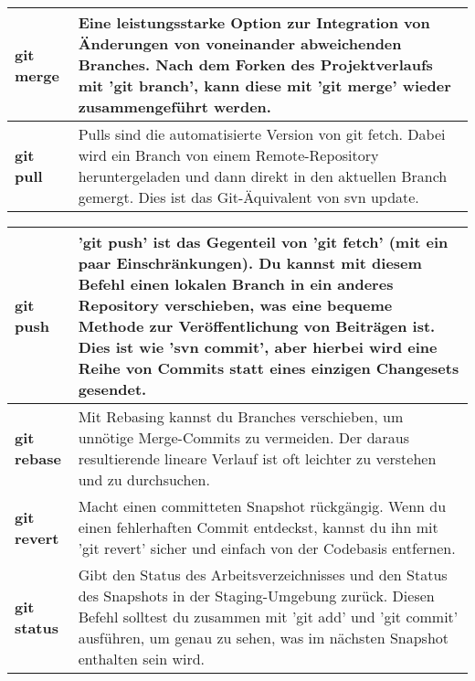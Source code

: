 \begin{center}
\begin{tabular}{|p{} | p{}|}
		\hline
		\textbf{git merge} & Eine leistungsstarke Option zur Integration von Änderungen von voneinander abweichenden Branches. Nach dem Forken des Projektverlaufs mit 'git branch', kann diese mit 'git merge' wieder zusammengeführt werden.\\
		\hline
		\textbf{git pull} & Pulls sind die automatisierte Version von git fetch. Dabei wird ein Branch von einem Remote-Repository heruntergeladen und dann direkt in den aktuellen Branch gemergt. Dies ist das Git-Äquivalent von svn update.\\
		\hline
	\end{tabular}
\end{center}

\begin{center}
	\setlength\arrayrulewidth{1pt}
	\begin{tabular}{|p{} | p{}|}
		\hline
		\textbf{git push} & 'git push' ist das Gegenteil von 'git fetch' (mit ein paar Einschränkungen). Du kannst mit diesem Befehl einen lokalen Branch in ein anderes Repository verschieben, was eine bequeme Methode zur Veröffentlichung von Beiträgen ist. Dies ist wie 'svn commit', aber hierbei wird eine Reihe von Commits statt eines einzigen Changesets gesendet.\\
		\hline
		\textbf{git rebase} & Mit Rebasing kannst du Branches verschieben, um unnötige Merge-Commits zu vermeiden. Der daraus resultierende lineare Verlauf ist oft leichter zu verstehen und zu durchsuchen.\\
		\hline
		\textbf{git revert} & Macht einen committeten Snapshot rückgängig. Wenn du einen fehlerhaften Commit entdeckst, kannst du ihn mit 'git revert' sicher und einfach von der Codebasis entfernen.\\
		\hline
		\textbf{git status} & Gibt den Status des Arbeitsverzeichnisses und den Status des Snapshots in der Staging-Umgebung zurück. Diesen Befehl solltest du zusammen mit 'git add' und 'git commit' ausführen, um genau zu sehen, was im nächsten Snapshot enthalten sein wird.\\
		\hline
	\end{tabular}
\end{center}